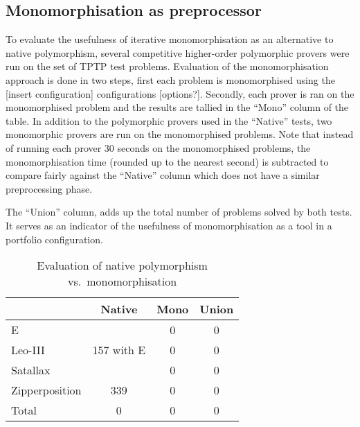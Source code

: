 \documentclass[]{ceurart}
\begin{document}
\subsection{Monomorphisation as preprocessor}

To evaluate the usefulness of iterative monomorphisation as an alternative to native polymorphism, several competitive higher-order polymorphic provers were run on the set of TPTP test problems. Evaluation of the monomorphisation approach is done in two steps, first each problem is monomorphised using the [insert configuration] configurations [options?]. Secondly, each prover is ran on the monomorphised problem and the results are tallied in the ``Mono'' column of the table. In addition to the polymorphic provers used in the ``Native'' tests, two monomorphic provers are run on the monomorphised problems. Note that instead of running each prover 30 seconds on the monomorphised problems, the monomorphisation time (rounded up to the nearest second) is subtracted to compare fairly against the ``Native'' column which does not have a similar preprocessing phase.

The ``Union'' column, adds up the total number of problems solved by both tests. It serves as an indicator of the usefulness of monomorphisation as a tool in a portfolio configuration.

\begin{table}[ht]
\caption{Evaluation of native polymorphism vs.\ monomorphisation}
\centering\begin{tabular}{@{}lccc@{}}
   \toprule
   & Native & Mono & Union \\
   \midrule
   E  &   & 0 & 0 \\
   Leo-III &  157 with E & 0 & 0 \\ 
   Satallax &  & 0 & 0 \\
   Zipperposition & 339 & 0 & 0 \\[1.5\jot]
   Total & 0 & 0 & 0 \\
   \bottomrule
\end{tabular}
\end{table}


\break
\end{document}
